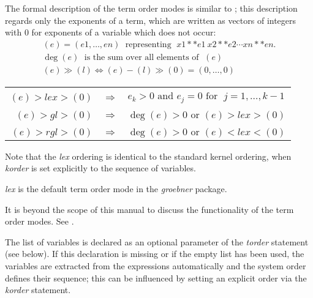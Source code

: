 The formal description of the term order modes is similar to
\cite{Kredel:88}; this description regards only the exponents of a term,
which are written as vectors of integers with $0$ for exponents of a
variable which does not occur:
\[
\begin{array}{l}
  (e) = (e1,\ldots , en) \;\mbox{ representing }\; x1**e1 \ x2**e2 \cdots
  xn**en. \\
  \deg(e) \; \mbox{ is the sum over all elements of } \;(e) \\
  (e) \gg (l) \Longleftrightarrow (e)-(l)\gg (0) = (0,\ldots ,0)
\end{array}
\]
\begin{center}
\begin{tabular}{@{}rll}
  \multicolumn{1}{l}{\hspace*{-.5cm}{\bf lex:}} \\
  $(e) > lex > (0)$ & $\Longrightarrow$ & $e_k > 0 \mbox{ and } e_j =0
  \mbox{ for }\; j=1,\ldots , k-1$ \\[2mm]
  \multicolumn{1}{l}{\hspace*{-.5cm}{\bf gradlex:}} \\
  $(e) >gl> (0)$    & $\Longrightarrow$ & $\deg(e)>0  \mbox { or } (e) >lex> (0)$ \\[2mm]
  \multicolumn{1}{l}{\hspace*{-.5cm}{\bf revgradlex:}} \\
  $(e) >rgl> (0)$   & $\Longrightarrow$ & $\deg(e)>0  \mbox{ or }(e)  <lex< (0)$
\end{tabular}
\end{center}

Note that the \emph{lex} ordering is identical to the standard \REDUCE
kernel ordering, when \emph{korder} is set explicitly to the sequence of
variables.

\emph{lex} is the default term order mode in the \emph{groebner} package.

It is beyond the scope of this manual to discuss the functionality of
the term order modes. See \cite{Buchberger:88}.

The list of variables is declared as an optional parameter of the
\emph{torder} statement (see below). If this declaration is missing
or if the empty list has been used, the variables are extracted from
the expressions automatically and the \REDUCE system order defines
their sequence; this can be influenced by setting an explicit order
via the \emph{korder} statement.

